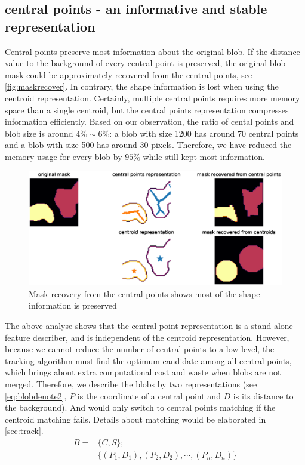 \subsection{central points - an informative and stable representation}
Central points preserve most information about the original blob. If the distance value to the background of every central point is preserved, the original blob mask could be approximately recovered from the central points, see \autoref{fig:maskrecover}. In contrary, the shape information is lost when using the centroid representation. Certainly, multiple central points requires more memory space than a single centroid, but the central points representation compresses information efficiently. Based on our observation, the ratio of cental points and blob size is around $4\%\sim6\%$: a blob with size 1200 has around 70 central points and a blob with size 500 has around 30 pixels. Therefore, we have reduced the memory usage for every blob by $95\%$ while still kept most information.
\begin{figure}
  \centering
  \includegraphics[width=\textwidth]{figures/maskrecover.eps}
  \caption{Mask recovery from the central points shows most of the shape information is preserved}\label{fig:maskrecover}
\end{figure}

The above analyse shows that the central point representation is a stand-alone feature describer, and is independent of the centroid representation. However, because we cannot reduce the number of central points to a low level, the tracking algorithm must find the optimum candidate among all central points, which brings about extra computational cost and waste when blobs are not merged. Therefore, we describe the blobs by two representations (see \autoref{eq:blobdenote2}, $P$ is the coordinate of a central point and $D$ is its distance to the background). And would only switch to central points matching if the centroid matching fails. Details about matching would be elaborated in \autoref{sec:track}.
\begin{equation}\label{eq:blobdenote2}
  \begin{split}
        B = &\{C,S\}; \\
        &\{(P_1,D_1),(P_2,D_2),\cdots,(P_n,D_n)\}
      \end{split}
\end{equation}

